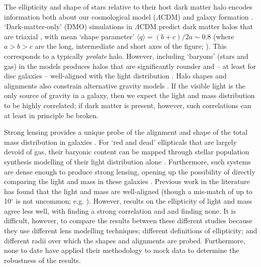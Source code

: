 \documentclass[useAMS,usenatbib]{mn2e}
\begin{document}
The ellipticity and shape of stars relative to their host dark matter halo encodes information both about our cosmological model ($\Lambda$CDM) and galaxy formation \citep[e.g.][]{1994ApJ...431..617D,2001ApJ...551..294I,2004ApJ...611L..73K,2007MNRAS.378...55M,2007arXiv0707.0737D,2012MNRAS.424L..16L,2014JPhG...41f3101R}. `Dark-matter-only' (DMO) simulations in $\Lambda$CDM predict dark matter halos that are triaxial \citep{1991ApJ...378..496D,1992ApJ...399..405W,1996ApJ...462..563N,2002ApJ...574..538J}, with mean `shape parameter' $\langle q \rangle = (b+c)/2a \sim 0.8$ (where $a > b > c$ are the long, intermediate and short axes of the figure; \citealt{2007MNRAS.378...55M}). This corresponds to a typically {\it prolate} halo. However, including `baryons' (stars and gas) in the models produces halos that are significantly rounder and -- at least for disc galaxies -- well-aligned with the light distribution \citep{1991ApJ...377..365K,1994ApJ...431..617D,2007arXiv0707.0737D}. Halo shapes and alignments also constrain alternative gravity models \citep{2001MNRAS.327..552M,2004ApJ...610L..97H,2005MNRAS.361..971R,2012PhRvD..86h3507F,2013MNRAS.434.2971D}. If the visible light is the only source of gravity in a galaxy, then we expect the light and mass distribution to be highly correlated; if dark matter is present, however, such correlations can at least in principle be broken.

Strong lensing provides a unique probe of the alignment and shape of the total mass distribution in galaxies \citep[e.g.][]{1986ApJ...310..568B,1992grle.book.....S,1998ApJ...509..561K,2000ApJ...543..131K,2006ApJ...649..599K,2007AJ....134..668A,2008MNRAS.383..857F,2010ApJ...724..511A,2012MNRAS.424..104L}. For `red and dead' ellipticals that are largely devoid of gas, their baryonic content can be mapped through stellar population synthesis modelling of their light distribution alone \citep[e.g.][]{2005ApJ...623L...5F,2006ApJ...640..662T,2008MNRAS.383..857F}. Furthermore, such systems are dense enough to produce strong lensing, opening up the possibility of directly comparing the light and mass in these galaxies \citep{1998ApJ...509..561K,2008MNRAS.383..857F,2009ApJ...690..670T,2012A&A...538A..99S}. Previous work in the literature has found that the light and mass are well-aligned (though a mis-match of up to 10$^\circ$ is not uncommon; e.g. \citealt{2012A&A...538A..99S}). However, results on the ellipticity of light and mass agree less well, with \citet{2012A&A...538A..99S} finding a strong correlation and \citet{1998ApJ...509..561K} and \citet{2008MNRAS.383..857F} finding none. It is difficult, however, to compare the results between these different studies because they use different lens modelling techniques; different definitions of ellipticity; and different radii over which the shapes and alignments are probed. Furthermore, none to date have applied their methodology to mock data to determine the robustness of the results.
\end{document}
